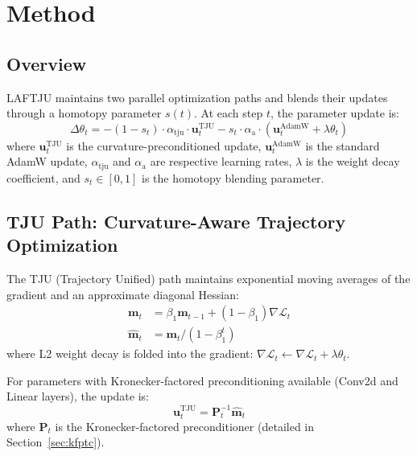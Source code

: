 \documentclass[10pt,twocolumn]{article}
\newcommand{\method}{LAFTJU}
\begin{document}
\section{Method}

\subsection{Overview}

\method{} maintains two parallel optimization paths and blends their updates through a homotopy parameter $s(t)$. At each step $t$, the parameter update is:
\begin{equation}
\Delta \theta_t = -(1-s_t) \cdot \alpha_{\text{tju}} \cdot \mathbf{u}_t^{\text{TJU}} - s_t \cdot \alpha_{\text{a}} \cdot (\mathbf{u}_t^{\text{AdamW}} + \lambda \theta_t)
\label{eq:blending}
\end{equation}
where $\mathbf{u}_t^{\text{TJU}}$ is the curvature-preconditioned update, $\mathbf{u}_t^{\text{AdamW}}$ is the standard AdamW update, $\alpha_{\text{tju}}$ and $\alpha_{\text{a}}$ are respective learning rates, $\lambda$ is the weight decay coefficient, and $s_t \in [0,1]$ is the homotopy blending parameter.

\subsection{TJU Path: Curvature-Aware Trajectory Optimization}

The TJU (Trajectory Unified) path maintains exponential moving averages of the gradient and an approximate diagonal Hessian:
\begin{align}
\mathbf{m}_t &= \beta_1 \mathbf{m}_{t-1} + (1-\beta_1) \nabla \mathcal{L}_t \\
\hat{\mathbf{m}}_t &= \mathbf{m}_t / (1 - \beta_1^t)
\end{align}
where L2 weight decay is folded into the gradient: $\nabla \mathcal{L}_t \leftarrow \nabla \mathcal{L}_t + \lambda \theta_t$.

For parameters with Kronecker-factored preconditioning available (Conv2d and Linear layers), the update is:
\begin{equation}
\mathbf{u}_t^{\text{TJU}} = \mathbf{P}_t^{-1} \hat{\mathbf{m}}_t
\end{equation}
where $\mathbf{P}_t$ is the Kronecker-factored preconditioner (detailed in Section~\ref{sec:kfptc}).
\end{document}
